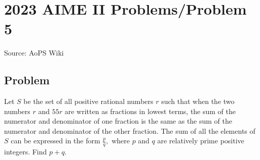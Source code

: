 \documentclass[12pt]{article}
\begin{document}
\section*{{2023 AIME II Problems/Problem 5}}
Source: AoPS Wiki

\subsection*{Problem}
Let $S$ be the set of all positive rational numbers $r$ such that when the two numbers $r$ and $55r$ are written as fractions in lowest terms, the sum of the numerator and denominator of one fraction is the same as the sum of the numerator and denominator of the other fraction. The sum of all the elements of $S$ can be expressed in the form $\frac{p}{q},$ where $p$ and $q$ are relatively prime positive integers. Find $p+q.$
\end{document}
